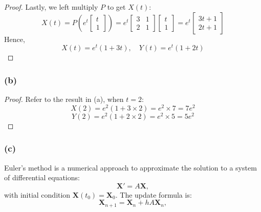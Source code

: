 \documentclass{article}
\begin{document}
\begin{proof}
    Lastly, we left multiply $P$ to get $X(t)$:
    \[ X(t) = P \left( e^t \begin{bmatrix} t \\ 1 \end{bmatrix} \right) = e^t \begin{bmatrix} 3 & 1 \\ 2 & 1 \end{bmatrix} \begin{bmatrix} t \\ 1 \end{bmatrix} = e^t \begin{bmatrix} 3t + 1 \\ 2t + 1 \end{bmatrix} \]
    Hence,
    \[ X(t) = e^t(1 + 3t), \quad Y(t) = e^t (1 + 2t) \]
\end{proof} 

\subsubsection*{(b)}
\begin{proof}
    Refer to the result in (a), when $t = 2$:
    \[ X(2) = e^2(1 + 3 \times 2) = e^2 \times 7 = 7e^2 \]
    \[ Y(2) = e^2(1 + 2 \times 2) = e^2 \times 5 = 5e^2 \]
\end{proof}

\subsubsection*{(c)}
Euler's method is a numerical approach to approximate the solution to a system of differential equations:
\[
    \mathbf{X}' = A \mathbf{X},
\]
with initial condition \( \mathbf{X}(t_0) = \mathbf{X}_0 \). The update formula is:
\[
    \mathbf{X}_{n+1} = \mathbf{X}_n + h A \mathbf{X}_n,
\]
\end{document}
